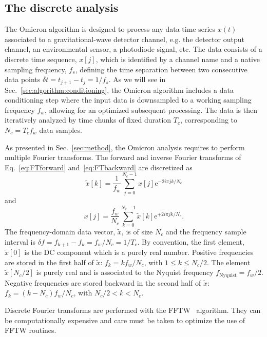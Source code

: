 \subsection{The discrete analysis} \label{sec:algorithm:discrete}

The Omicron algorithm is designed to process any data time series $x(t)$ associated to a gravitational-wave detector channel, e.g. the detector output channel, an environmental sensor, a photodiode signal, etc. The data consists of a discrete time sequence, $x[j]$, which is identified by a channel name and a native sampling frequency, $f_s$, defining the time separation between two consecutive data points $\delta t = t_{j+1}-t_j = 1/f_s$. As we will see in Sec.~\ref{sec:algorithm:conditioning}, the Omicron algorithm includes a data conditioning step where the input data is downsampled to a working sampling frequency $f_w$, allowing for an optimized subsequent processing. The data is then iteratively analyzed by time chunks of fixed duration $T_c$, corresponding to $N_c=T_cf_w$ data samples.

As presented in Sec.~\ref{sec:method}, the Omicron analysis requires to perform multiple Fourier transforms. The forward and inverse Fourier transforms of Eq.~\ref{eq:FTforward} and~\ref{eq:FTbackward} are discretized as 
\begin{equation}
  \tilde{x}[k]=\frac{1}{f_w}\sum_{j=0}^{N_c-1}{x[j]\mathrm{e}^{-2i\pi jk/N_c}}
  \label{eq:dFTforward}
\end{equation}
and
\begin{equation}
  x[j]=\frac{f_w}{N_c}\sum_{k=0}^{N_c-1}{\tilde{x}[k]\mathrm{e}^{+2i\pi jk/N_c}}.
  \label{eq:dFTbackward}
\end{equation}
The frequency-domain data vector, $\tilde{x}$, is of size $N_c$ and the frequency sample interval is $\delta f = f_{k+1}-f_k = f_w/N_c = 1/T_c$. By convention, the first element, $\tilde{x}[0]$ is the DC component which is a purely real number. Positive frequencies are stored in the first half of $\tilde{x}$: $f_k=kf_w/N_c$, with $1\le k \le N_c/2$. The element $\tilde{x}[N_c/2]$ is purely real and is associated to the Nyquist frequency $f_{\text{Nyquist}}=f_w/2$. Negative frequencies are stored backward in the second half of $\tilde{x}$: $f_k=(k-N_c)f_w/N_c$, with $N_c/2 < k < N_c$.

Discrete Fourier transforms are performed with the FFTW~\cite{FFTW} algorithm. They can be computationally expensive and care must be taken to optimize the use of FFTW routines.

